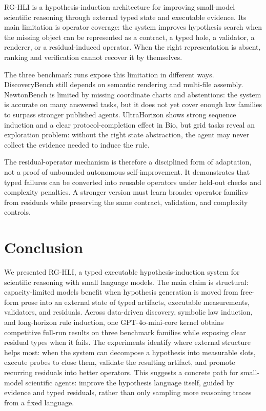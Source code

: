 \documentclass[letterpaper]{article}
\newcommand{\methodshort}{\textsc{RG-HLI}\xspace}
\newcommand{\gptmini}{GPT-4o-mini\xspace}
\begin{document}
\methodshort is a hypothesis-induction architecture for improving small-model
scientific reasoning through external typed state and executable evidence. Its
main limitation is operator coverage: the system improves hypothesis search
when the missing object can be represented as a contract, a typed hole, a
validator, a renderer, or a residual-induced operator. When the right
representation is absent, ranking and verification cannot recover it by
themselves.

The three benchmark runs expose this limitation in different ways.
DiscoveryBench still depends on semantic rendering and multi-file assembly.
NewtonBench is limited by missing coordinate charts and abstentions: the system
is accurate on many answered tasks, but it does not yet cover enough law
families to surpass stronger published agents. UltraHorizon shows strong
sequence induction and a clear protocol-completion effect in Bio, but grid
tasks reveal an exploration problem: without the right state abstraction, the
agent may never collect the evidence needed to induce the rule.

The residual-operator mechanism is therefore a disciplined form of adaptation,
not a proof of unbounded autonomous self-improvement. It demonstrates that
typed failures can be converted into reusable operators under held-out checks
and complexity penalties. A stronger version must learn broader operator
families from residuals while preserving the same contract, validation, and
complexity controls.

\section{Conclusion}

We presented \methodshort, a typed executable hypothesis-induction system for
scientific reasoning with small language models. The main claim is structural:
capacity-limited models benefit when hypothesis generation is moved from free-form prose
into an external state of typed artifacts, executable measurements, validators,
and residuals. Across data-driven discovery, symbolic law induction, and
long-horizon rule induction, one \gptmini-core kernel obtains competitive
full-run results on three benchmark families while exposing clear residual
types when it fails. The experiments identify where external structure helps
most: when the system can decompose a hypothesis into measurable slots, execute
probes to close them, validate the resulting artifact, and promote recurring
residuals into better operators. This suggests a concrete path for small-model
scientific agents: improve the hypothesis language itself, guided by evidence
and typed residuals, rather than only sampling more reasoning traces from a
fixed language.
\end{document}
